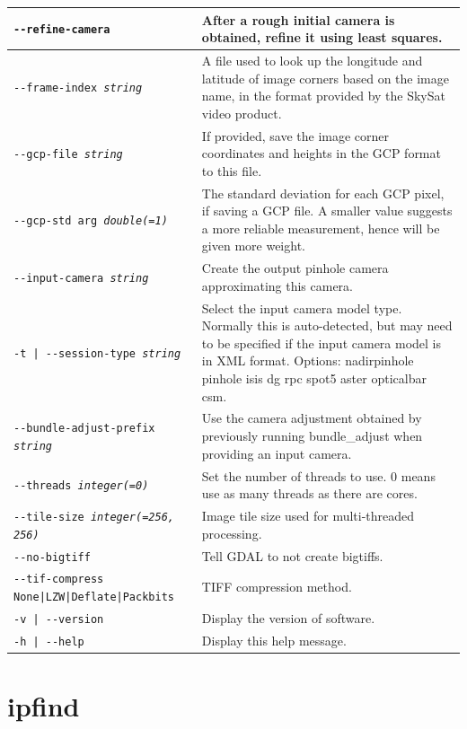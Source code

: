 \begin{longtable}{|l|p{7.5cm}|}
\texttt{-\/-refine-camera} & After a rough initial camera is obtained, refine it using least squares.\\ \hline
\texttt{-\/-frame-index \textit{string} } & A file used to look up the longitude and latitude of image corners based on the image name, in the format provided by the SkySat video product.\\ \hline
\texttt{-\/-gcp-file \textit{string} } & If provided, save the image corner coordinates and heights in the GCP format to this file.\\ \hline
\texttt{-\/-gcp-std arg \textit{double(=1)} } & The standard deviation for each GCP pixel, if saving a GCP file. A smaller value suggests a more reliable measurement, hence will be given more weight.\\ \hline
\texttt{-\/-input-camera \textit{string} } & Create the output pinhole camera approximating this camera. \\ \hline
\texttt{-t | -\/-session-type  \textit{string}} & Select the input camera model type. Normally this is auto-detected, but may need to be specified if the input camera model is in XML format. Options: nadirpinhole pinhole isis dg rpc spot5 aster opticalbar csm.\\ \hline
\texttt{-\/-bundle-adjust-prefix \textit{string}} & Use the camera adjustment obtained by previously running bundle\_adjust when providing an input camera. \\ \hline
\texttt{-\/-threads \textit{integer(=0)}} & Set the number of threads to use. 0 means use as many threads as there are cores.\\ \hline
\texttt{-\/-tile-size \textit{integer(=256, 256)} } &
 Image tile size used for multi-threaded processing.\\ \hline
\texttt{-\/-no-bigtiff } & Tell GDAL to not create bigtiffs.\\ \hline
\texttt{-\/-tif-compress None|LZW|Deflate|Packbits} & TIFF compression method.\\ \hline
\texttt{-v | -\/-version  } & Display the version of software.\\ \hline
\texttt{-h | -\/-help  } & Display this help message.\\ \hline
\end{longtable}

\section{ipfind}
\label{ipfind}

